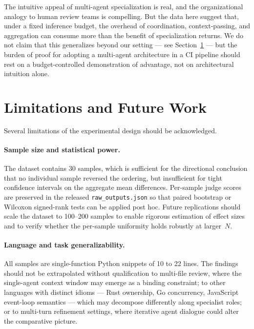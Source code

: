 \documentclass[pdflatex,sn-mathphys-num]{sn-jnl}
\theoremstyle{thmstyleone}
\theoremstyle{thmstyletwo}
\theoremstyle{thmstylethree}
\begin{document}
The intuitive appeal of multi-agent specialization is real, and the organizational analogy to human review teams is compelling. But the data here suggest that, under a fixed inference budget, the overhead of coordination, context-passing, and aggregation can consume more than the benefit of specialization returns. We do not claim that this generalizes beyond our setting --- see Section~\ref{sec:limitations} --- but the burden of proof for adopting a multi-agent architecture in a CI pipeline should rest on a budget-controlled demonstration of advantage, not on architectural intuition alone.

\section{Limitations and Future Work}\label{sec:limitations}

Several limitations of the experimental design should be acknowledged.

\paragraph{Sample size and statistical power.} The dataset contains 30 samples, which is sufficient for the directional conclusion that no individual sample reversed the ordering, but insufficient for tight confidence intervals on the aggregate mean differences. Per-sample judge scores are preserved in the released \texttt{raw\_outputs.json} so that paired bootstrap or Wilcoxon signed-rank tests can be applied post hoc. Future replications should scale the dataset to 100--200 samples to enable rigorous estimation of effect sizes and to verify whether the per-sample uniformity holds robustly at larger~$N$.

\paragraph{Language and task generalizability.} All samples are single-function Python snippets of 10 to 22 lines. The findings should not be extrapolated without qualification to multi-file review, where the single-agent context window may emerge as a binding constraint; to other languages with distinct idioms --- Rust ownership, Go concurrency, JavaScript event-loop semantics --- which may decompose differently along specialist roles; or to multi-turn refinement settings, where iterative agent dialogue could alter the comparative picture.
\end{document}
